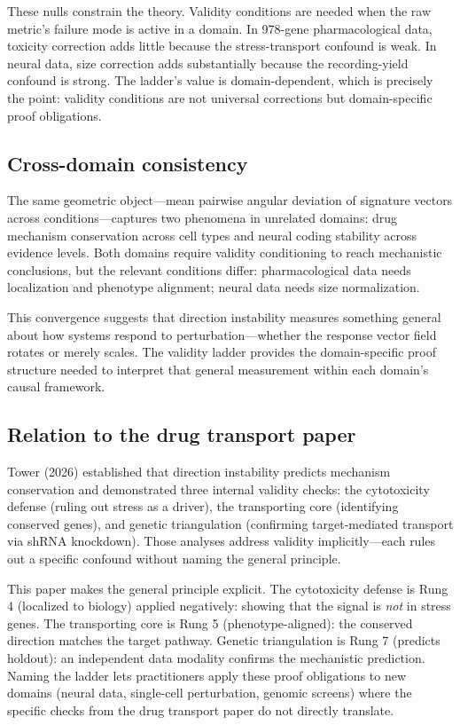 \documentclass{article}
\begin{document}
These nulls constrain the theory. Validity conditions are needed when the raw
metric's failure mode is active in a domain. In 978-gene pharmacological data,
toxicity correction adds little because the stress-transport confound is weak.
In neural data, size correction adds substantially because the recording-yield
confound is strong. The ladder's value is domain-dependent, which is precisely
the point: validity conditions are not universal corrections but domain-specific
proof obligations.

\subsection{Cross-domain consistency}

The same geometric object---mean pairwise angular deviation of signature
vectors across conditions---captures two phenomena in unrelated domains:
drug mechanism conservation across cell types and neural coding stability
across evidence levels. Both domains require validity conditioning to reach
mechanistic conclusions, but the relevant conditions differ: pharmacological
data needs localization and phenotype alignment; neural data needs size
normalization.

This convergence suggests that direction instability measures something
general about how systems respond to perturbation---whether the response
vector field rotates or merely scales. The validity ladder provides the
domain-specific proof structure needed to interpret that general measurement
within each domain's causal framework.

\subsection{Relation to the drug transport paper}

Tower (2026) established that direction instability predicts mechanism
conservation and demonstrated three internal validity checks: the cytotoxicity
defense (ruling out stress as a driver), the transporting core (identifying
conserved genes), and genetic triangulation (confirming target-mediated
transport via shRNA knockdown). Those analyses address validity implicitly---each
rules out a specific confound without naming the general principle.

This paper makes the general principle explicit. The cytotoxicity defense is
Rung 4 (localized to biology) applied negatively: showing that the signal is
\emph{not} in stress genes. The transporting core is Rung 5 (phenotype-aligned):
the conserved direction matches the target pathway. Genetic triangulation is
Rung 7 (predicts holdout): an independent data modality confirms the mechanistic
prediction. Naming the ladder lets practitioners apply these proof obligations
to new domains (neural data, single-cell perturbation, genomic screens) where
the specific checks from the drug transport paper do not directly translate.
\end{document}
